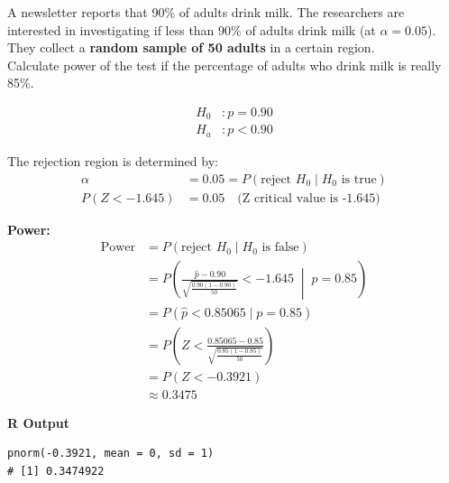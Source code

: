 \begin{example}
A newsletter reports that 90\% of adults drink milk. The researchers are interested in investigating if less than 90\% of adults drink milk (at \( \alpha = 0.05 \)). They collect a \textbf{random sample of 50 adults} in a certain region. \\

Calculate power of the test if the percentage of adults who drink milk is really 85\%.

\begin{align*}
H_0 &: p = 0.90 \\
H_a &: p < 0.90
\end{align*}

The rejection region is determined by:
\begin{align*}
\alpha &= 0.05 = P(\text{reject } H_0 \mid H_0 \text{ is true}) \\
P(Z < -1.645) &= 0.05 \quad \text{(Z critical value is -1.645)}
\end{align*}

\textbf{Power:}
\begin{align*}
\text{Power} &= P(\text{reject } H_0 \mid H_0 \text{ is false}) \\
&= P\left( \frac{\hat{p} - 0.90}{\sqrt{\frac{0.90(1-0.90)}{50}}} < -1.645 \;\middle|\; p = 0.85 \right) \\
&= P(\hat{p} < 0.85065 \mid p = 0.85) \\
&= P\left( Z < \frac{0.85065 - 0.85}{\sqrt{\frac{0.85(1 - 0.85)}{50}}} \right) \\
&= P(Z < -0.3921) \\
&\approx 0.3475
\end{align*}

\noindent\textbf{R Output}
\begin{tcolorbox}[colback=gray!10, colframe=black!45, arc=2mm]
\begin{verbatim}
pnorm(-0.3921, mean = 0, sd = 1)
# [1] 0.3474922
\end{verbatim}
\end{tcolorbox}
\end{example}

